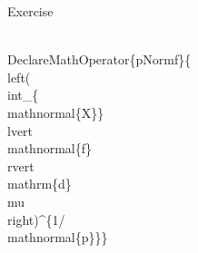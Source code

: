 \documentclass{beamer}
\begin{document}
\begin{frame}
{\begin{exampleblock}{Exercise}
{\begin{semiverbatim}
\end{semiverbatim}
\begin{semiverbatim}
\\DeclareMathOperator\{pNormf\}\{\\left(\\int\_\{\\mathnormal\{X\}\} \newline\\lvert\\mathnormal\{f\}\\rvert\,\\mathrm\{d\}\\mu \\right)\string^\{1/\\mathnormal\{p\}\}\}
\end{semiverbatim}
}
\end{exampleblock}
}
\end{frame}
\end{document}
